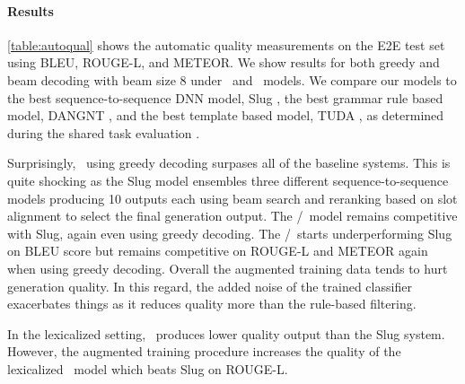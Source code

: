 




\paragraph{Results} \autoref{table:autoqual} shows the automatic quality measurements on
the E2E test set using BLEU, ROUGE-L, and METEOR.
We show results for both greedy and beam decoding with beam size 8
under \basegen~and
\auggen~models. We compare our models to the best sequence-to-sequence DNN
model, Slug \cite{juraskaslug2slug}, the best grammar rule based model, 
DANGNT \cite{nguyen2018structurebased},
and the best template based model, TUDA \cite{puzikov2018e2e}, as determined during 
the shared task evaluation \cite{duvsek2019evaluating}.





Surprisingly, \basegen~using greedy decoding surpases all of the 
baseline systems. This is quite shocking as the Slug model ensembles
three different sequence-to-sequence models producing 10 outputs each using beam search and reranking based on slot alignment to select the final generation
output. The \auggen/~model remains competitive with Slug, 
again even using greedy decoding.
The \auggen/\learnedclf~starts underperforming Slug on BLEU score but
remains competitive on ROUGE-L and METEOR again when using greedy decoding.
Overall the augmented training data tends to hurt generation quality.
In this regard, the added noise of the trained classifier exacerbates things
as it reduces quality more than the rule-based filtering. 

In the lexicalized setting,
\basegen~produces lower quality output than the Slug system.
However, the augmented training procedure increases
the quality of the lexicalized \auggen~model which beats Slug on ROUGE-L.


